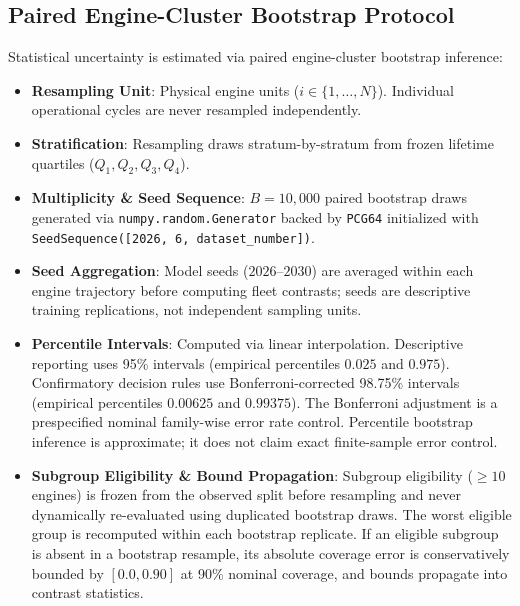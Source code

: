 \subsection*{Paired Engine-Cluster Bootstrap Protocol}
Statistical uncertainty is estimated via paired engine-cluster bootstrap inference:
\begin{itemize}
    \item \textbf{Resampling Unit}: Physical engine units ($i \in \{1, \dots, N\}$). Individual operational cycles are never resampled independently.
    \item \textbf{Stratification}: Resampling draws stratum-by-stratum from frozen lifetime quartiles ($Q_1, Q_2, Q_3, Q_4$).
    \item \textbf{Multiplicity \& Seed Sequence}: $B = 10{,}000$ paired bootstrap draws generated via \texttt{numpy.random.Generator} backed by \texttt{PCG64} initialized with \texttt{SeedSequence([2026, 6, dataset\_number])}.
    \item \textbf{Seed Aggregation}: Model seeds ($2026$--$2030$) are averaged within each engine trajectory before computing fleet contrasts; seeds are descriptive training replications, not independent sampling units.
    \item \textbf{Percentile Intervals}: Computed via linear interpolation. Descriptive reporting uses 95\% intervals (empirical percentiles $0.025$ and $0.975$). Confirmatory decision rules use Bonferroni-corrected 98.75\% intervals (empirical percentiles $0.00625$ and $0.99375$). The Bonferroni adjustment is a prespecified nominal family-wise error rate control. Percentile bootstrap inference is approximate; it does not claim exact finite-sample error control.
    \item \textbf{Subgroup Eligibility \& Bound Propagation}: Subgroup eligibility ($\ge 10$ engines) is frozen from the observed split before resampling and never dynamically re-evaluated using duplicated bootstrap draws. The worst eligible group is recomputed within each bootstrap replicate. If an eligible subgroup is absent in a bootstrap resample, its absolute coverage error is conservatively bounded by $[0.0, 0.90]$ at 90\% nominal coverage, and bounds propagate into contrast statistics.
\end{itemize}

